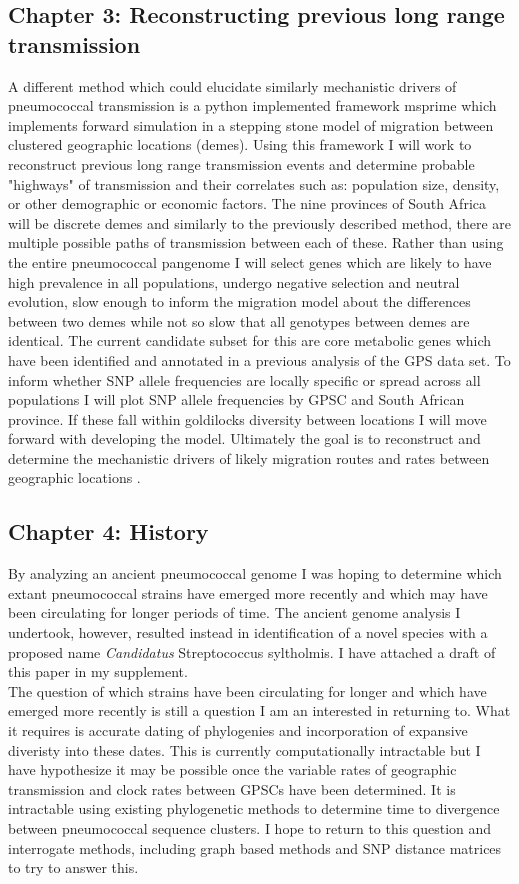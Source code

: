 \documentclass{article}
\begin{document}
\subsection{Chapter 3: Reconstructing previous long range transmission}
A different method which could elucidate similarly mechanistic drivers of pneumococcal transmission is a python implemented framework msprime which implements forward simulation in a stepping stone model of migration between clustered geographic locations (demes). Using this framework I will work to reconstruct previous long range transmission events and determine probable "highways" of transmission and their correlates such as: population size, density, or other demographic or economic factors. The nine provinces of South Africa will be discrete demes and similarly to the previously described method, there are multiple possible paths of transmission between each of these. Rather than using the entire pneumococcal pangenome I will select genes which are likely to have high prevalence in all populations, undergo negative selection and neutral evolution, slow enough to inform the migration model about the differences between two demes while not so slow that all genotypes between demes are identical. The current candidate subset for this are core metabolic genes which have been identified and annotated in a previous analysis of the GPS data set. To inform whether SNP allele frequencies are locally specific or spread across all populations I will plot SNP allele frequencies by GPSC and South African province. If these fall within goldilocks diversity between locations I will move forward with developing the model. Ultimately the goal is to reconstruct and determine the mechanistic drivers of likely migration routes and rates between geographic locations \cite{kelleherEfficientCoalescentSimulation2016,gutenkunstInferringJointDemographic2009}. 
\subsection{Chapter 4: History}
By analyzing an ancient pneumococcal genome I was hoping to determine which extant pneumococcal strains have emerged more recently and which may have been circulating for longer periods of time. The ancient genome analysis I undertook, however, resulted instead in identification of a novel species with a proposed name \textit{Candidatus} Streptococcus syltholmis. I have attached a draft of this paper in my supplement. \\The question of which strains have been circulating for longer and which have emerged more recently is still a question I am an interested in returning to. What it requires is accurate dating of phylogenies and incorporation of expansive diveristy into these dates. This is currently computationally intractable but I have hypothesize it may be possible once the variable rates of geographic transmission and clock rates between GPSCs have been determined. It is intractable using existing phylogenetic methods to determine time to divergence between pneumococcal sequence clusters. I hope to return to this question and interrogate methods, including graph based methods and SNP distance matrices to try to answer this.
\end{document}
